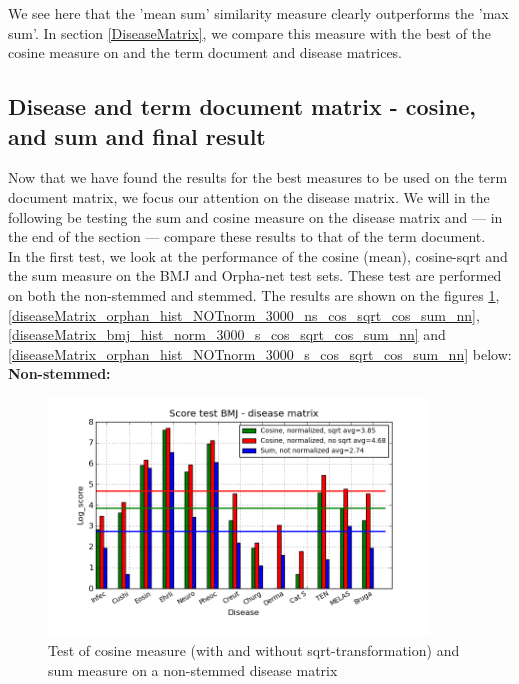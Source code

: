 We see here that the 'mean sum' similarity measure clearly outperforms the 'max sum'. 
In section \ref{DiseaseMatrix}, we compare this measure with the best of the cosine 
measure on and the term document and disease matrices.

\subsection{Disease and term document matrix - cosine, and sum and final result}

Now that we have found the results for the best measures to be used on
the term document matrix, we focus our attention on the disease
matrix. We will in the following be testing the sum and cosine measure
on the disease matrix and --- in the end of the section --- compare these
results to that of the term document. \\

In the first test, we look at the performance of the cosine (mean),
cosine-sqrt and the sum measure on the BMJ and Orpha-net test
sets. These test are performed on both the non-stemmed and
stemmed. The results are shown on the figures
\ref{diseaseMatrix_bmj_hist_norm_3000_ns_cos_sqrt_cos_sum_nn},
\ref{diseaseMatrix_orphan_hist_NOTnorm_3000_ns_cos_sqrt_cos_sum_nn},
\ref{diseaseMatrix_bmj_hist_norm_3000_s_cos_sqrt_cos_sum_nn} and
\ref{diseaseMatrix_orphan_hist_NOTnorm_3000_s_cos_sqrt_cos_sum_nn}
below: \\

\textbf{Non-stemmed:}

\begin{figure}[H]
        \begin{center}
          \includegraphics[width=0.9\textwidth]{barcharts/diseaseMatrix_bmj_hist_norm_3000_ns_cos_sqrt_cos_sum_nn.png}
        \end{center}
        \caption{Test of cosine measure (with and without sqrt-transformation) and sum measure on a non-stemmed disease matrix}
        \label{diseaseMatrix_bmj_hist_norm_3000_ns_cos_sqrt_cos_sum_nn}
\end{figure}

